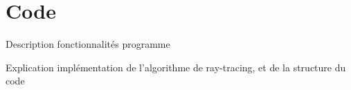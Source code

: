 \chapter{Code}
\label{chaper-2}

Description fonctionnalités programme

Explication implémentation de l'algorithme de ray-tracing, et de la structure du code
